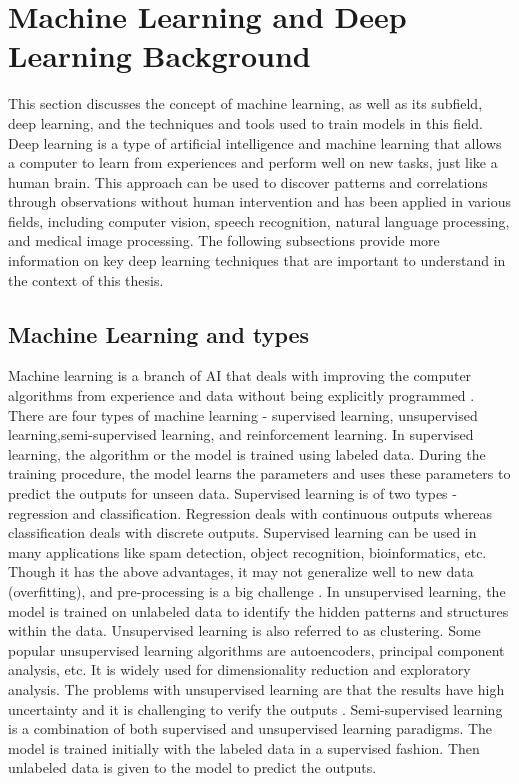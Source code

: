 \documentclass{report}
\begin{document}
	\section{Machine Learning and Deep Learning Background}
	This section discusses the concept of machine learning, as well as its subfield, deep learning, and the techniques and tools used to train models in this field. Deep learning is a type of artificial intelligence and machine learning that allows a computer to learn from experiences and perform well on new tasks, just like a human brain. This approach can be used to discover patterns and correlations through observations without human intervention and has been applied in various fields, including computer vision, speech recognition, natural language processing, and medical image processing. The following subsections provide more information on key deep learning techniques that are important to understand in the context of this thesis.
	
	\subsection{Machine Learning and types}
	Machine learning is a branch of AI that deals with improving the computer algorithms from experience and data without being explicitly programmed \cite{koza1996automated}. There	are four types of machine learning - supervised learning, unsupervised learning,semi-supervised learning, and reinforcement learning.
	In supervised learning, the algorithm or the model is trained using labeled data.
	During the training procedure, the model learns the parameters and uses these parameters to predict the outputs for unseen data. Supervised learning is of two types - regression and classification. Regression deals with continuous outputs whereas classification deals with discrete outputs. Supervised learning can be used in many applications like spam detection, object recognition, bioinformatics, etc. Though it has the above advantages, it may not generalize well to new data (overfitting), and pre-processing is a big challenge \cite{suplngdetails}.
	In unsupervised learning, the model is trained on unlabeled data to identify the
	hidden patterns and structures within the data. Unsupervised learning is also referred to as clustering. Some popular unsupervised learning algorithms are autoencoders, principal component analysis, etc. It is widely used for dimensionality reduction and exploratory analysis. The problems with unsupervised learning are that the results have high uncertainty and it is challenging to verify the outputs \cite{unsuplngdetails}.
	Semi-supervised learning is a combination of both supervised and unsupervised
	learning paradigms. The model is trained initially with the labeled data in a supervised fashion. Then unlabeled data is given to the model to predict the outputs.
	
\end{document}
